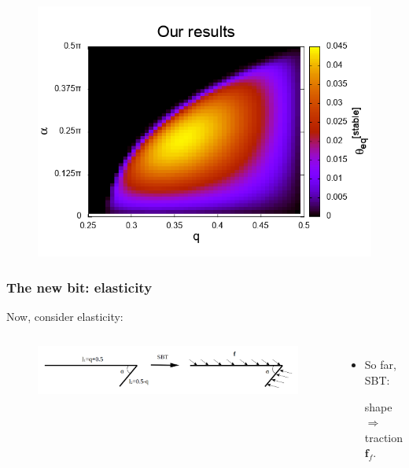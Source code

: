 \documentclass{beamer}
\newcommand{\bi}{\begin{itemize}}
\newcommand{\ei}{\end{itemize}}
\begin{document}
\begin{frame}
\begin{overlayarea}{\textwidth}{\textheight}
\begin{figure}
\begin{minipage}{0.46\linewidth}
		\end{minipage}
		\begin{minipage}{0.52\linewidth}
			\centering
			\includegraphics[width=\linewidth]{plots/analytical_straight_contour_theta_range.png} 
		\end{minipage}
	\end{figure}
	\end{overlayarea}
\end{frame}




\begin{frame}
	\frametitle{The new bit: elasticity}
	\begin{overlayarea}{\textwidth}{\textheight}
\vspace{-0.5cm}\small	Now, consider elasticity:\vspace{-0.3cm}
		\begin{columns}
			\vspace{-0.5cm}
		\begin{figure}[htb]
			\begin{center}
				\includegraphics[width=1.05\textwidth]{plots/shape_to_traction.png}
			\end{center}
		\end{figure}
		\bi 
		\item \small So far, SBT:
		
		 shape $\Longrightarrow$ traction $\mathbf{f}_f$.
		\ei
	\end{columns}
	\end{overlayarea}
\end{frame}
\end{document}
